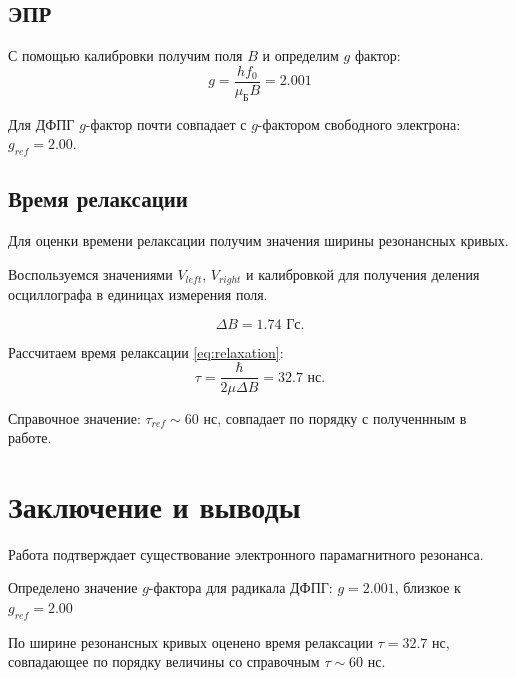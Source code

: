 \documentclass[a4paper, 12pt]{article} %
\begin{document}
	\subsection{ЭПР}
	
	С помощью калибровки получим поля $B$ и определим $g$ фактор:
	$$ g = \frac{h f_0}{\mu_{\text{Б}}B} = 2.001 $$
	
	Для ДФПГ $g$-фактор почти совпадает с $g$-фактором свободного электрона: $g_{ref} = 2.00$.
	
	\subsection*{Время релаксации}
	
	Для оценки времени релаксации получим значения ширины резонансных кривых.
	
	Воспользуемся значениями $V_{left}$, $V_{right}$ и калибровкой для получения деления осциллографа в единицах измерения поля.
	
	$$ \Delta B = 1.74  \text{ Гс}. $$

	
	Рассчитаем время релаксации \eqref{eq:relaxation}:
	$$ \tau = \frac{\hbar}{2 \mu \Delta B} = 32.7 \text{ нс}. $$
	
	Справочное значение: $ \tau_{ref} \sim 60 \text{ нс}$, совпадает по порядку с полученнным в работе.
	\section*{Заключение и выводы}
	
	Работа подтверждает существование электронного парамагнитного резонанса.
	
	Определено значение $g$-фактора для радикала ДФПГ: $g = 2.001$, близкое к $g_{ref} = 2.00$
	
	По ширине резонансных кривых оценено время релаксации $\tau = 32.7$ нс, совпадающее по порядку величины со справочным $\tau \sim 60$ нс.
		
\end{document}
